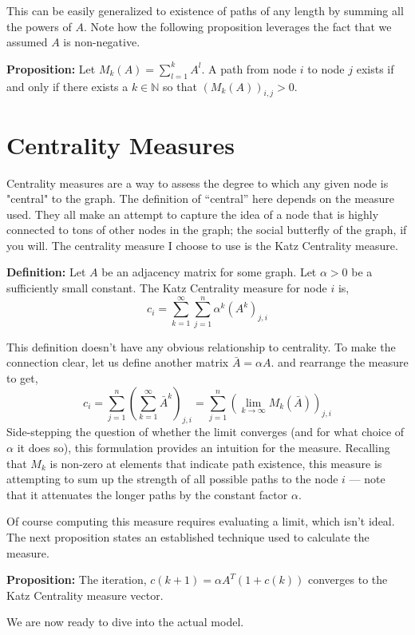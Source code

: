 This can be easily generalized to existence of paths of any length by summing all the powers of \(A.\)
Note how the following proposition leverages the fact that we assumed $A$ is non-negative.

\textbf{Proposition:} Let \(M_k(A) = \sum_{l=1}^k A^l.\) A path from node \(i\) to node \(j\) exists if and only if there exists a \(k \in \mathbb{N}\) so that \((M_k(A))_{i,j} > 0.\)

\section{Centrality Measures}
Centrality measures are a way to assess the degree to which any given node is "central" to the graph.
The definition of ``central'' here depends on the measure used.
They all make an attempt to capture the idea of a node that is highly connected to tons of other nodes in the graph;
the social butterfly of the graph, if you will.
The centrality measure I choose to use is the Katz Centrality measure.

\textbf{Definition:} Let \(A\) be an adjacency matrix for some graph.
Let \(\alpha > 0\) be a sufficiently small constant.
The Katz Centrality measure for node \(i\) is,
\[
  c_i = \sum_{k=1}^{\infty}{ \sum_{j=1}^{n}{ \alpha^k (A^k)_{j,i} } }
\]

This definition doesn't have any obvious relationship to centrality.
To make the connection clear, let us define another matrix \(\bar{A} = \alpha A.\) and rearrange the measure to get,
\[
  c_i = \sum_{j=1}^{n}{ \left( \sum_{k=1}^{\infty} \bar{A}^k \right)_{j,i} } = \sum_{j=1}^{n}{ \left( \lim_{k\to \infty} M_k(\bar{A}) \right)_{j,i}}
\]
Side-stepping the question of whether the limit converges (and for what choice of \(\alpha\) it does so), this formulation provides an intuition for the measure.
Recalling that \(M_k\) is non-zero at elements that indicate path existence, this measure is attempting to sum up the strength of all possible paths to the node \(i\) --- note that it attenuates the longer paths by the constant factor \(\alpha.\)

Of course computing this measure requires evaluating a limit, which isn't ideal.
The next proposition states an established technique used to calculate the measure.

\textbf{Proposition:} The iteration, \(c(k+1) = \alpha A^T(1 + c(k))\) converges to the Katz Centrality measure vector.

We are now ready to dive into the actual model.
